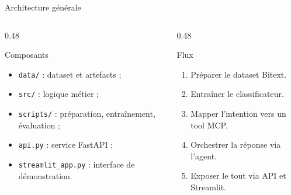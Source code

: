 \documentclass[aspectratio=169,10pt]{beamer}
\begin{document}
\begin{frame}{Architecture générale}
    \begin{columns}[T]
        \begin{column}{0.48\textwidth}
            \begin{block}{Composants}
                \begin{itemize}
                    \item \texttt{data/} : dataset et artefacts ;
                    \item \texttt{src/} : logique métier ;
                    \item \texttt{scripts/} : préparation, entraînement, évaluation ;
                    \item \texttt{api.py} : service FastAPI ;
                    \item \texttt{streamlit\_app.py} : interface de démonstration.
                \end{itemize}
            \end{block}
        \end{column}
        \begin{column}{0.48\textwidth}
            \begin{block}{Flux}
                \begin{enumerate}
                    \item Préparer le dataset Bitext.
                    \item Entraîner le classificateur.
                    \item Mapper l'intention vers un tool MCP.
                    \item Orchestrer la réponse via l'agent.
                    \item Exposer le tout via API et Streamlit.
                \end{enumerate}
            \end{block}
        \end{column}
    \end{columns}
\end{frame}
\end{document}
